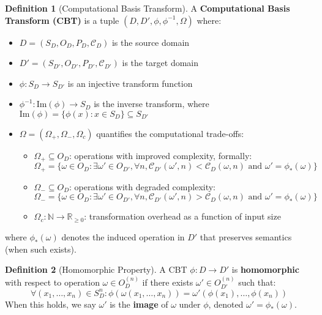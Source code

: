 \documentclass[11pt]{article}
\theoremstyle{definition}
\newtheorem{definition}{Definition}
\begin{document}
\begin{definition}[Computational Basis Transform]
\label{def:cbt}
A \textbf{Computational Basis Transform (CBT)} is a tuple $(D, D', \phi, \phi^{-1}, \Omega)$ where:
\begin{itemize}
\item $D = (S_D, O_D, P_D, \mathcal{C}_D)$ is the source domain
\item $D' = (S_{D'}, O_{D'}, P_{D'}, \mathcal{C}_{D'})$ is the target domain  
\item $\phi: S_D \to S_{D'}$ is an injective transform function
\item $\phi^{-1}: \mathrm{Im}(\phi) \to S_D$ is the inverse transform, where $\mathrm{Im}(\phi) = \{\phi(x) : x \in S_D\} \subseteq S_{D'}$
\item $\Omega = (\Omega_+, \Omega_-, \Omega_c)$ quantifies the computational trade-offs:
  \begin{itemize}
  \item $\Omega_+ \subseteq O_D$: operations with improved complexity, formally:
    $$\Omega_+ = \{\omega \in O_D : \exists \omega' \in O_{D'}, \forall n, \mathcal{C}_{D'}(\omega', n) < \mathcal{C}_D(\omega, n) \text{ and } \omega' = \phi_*(\omega)\}$$
  \item $\Omega_- \subseteq O_D$: operations with degraded complexity:
    $$\Omega_- = \{\omega \in O_D : \exists \omega' \in O_{D'}, \forall n, \mathcal{C}_{D'}(\omega', n) > \mathcal{C}_D(\omega, n) \text{ and } \omega' = \phi_*(\omega)\}$$
  \item $\Omega_c: \mathbb{N} \to \mathbb{R}_{\geq 0}$: transformation overhead as a function of input size
  \end{itemize}
\end{itemize}
where $\phi_*(\omega)$ denotes the induced operation in $D'$ that preserves semantics (when such exists).
\end{definition}

\begin{definition}[Homomorphic Property]
A CBT $\phi: D \to D'$ is \textbf{homomorphic} with respect to operation $\omega \in O_D^{(n)}$ if there exists $\omega' \in O_{D'}^{(n)}$ such that:
\begin{equation}
\forall (x_1, \ldots, x_n) \in S_D^n: \phi(\omega(x_1, \ldots, x_n)) = \omega'(\phi(x_1), \ldots, \phi(x_n))
\end{equation}
When this holds, we say $\omega'$ is the \textbf{image} of $\omega$ under $\phi$, denoted $\omega' = \phi_*(\omega)$.
\end{definition}
\end{document}
